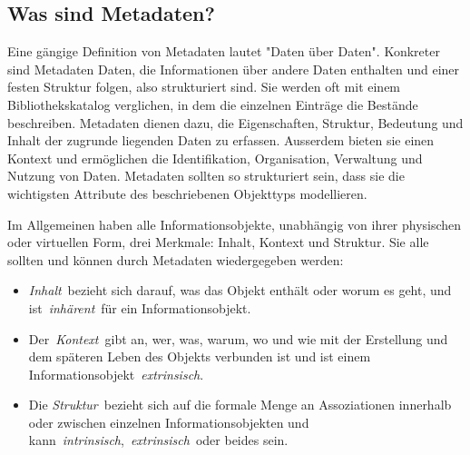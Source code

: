 \documentclass[
  nswissgerman,
  letterpaper,
  DIV=11,
  numbers=noendperiod]{scrartcl}
\begin{document}
\subsection{Was sind Metadaten?}\label{was-sind-metadaten}

Eine gängige Definition von Metadaten lautet "Daten über Daten".
Konkreter sind Metadaten Daten, die Informationen über andere Daten
enthalten und einer festen Struktur folgen, also strukturiert sind. Sie
werden oft mit einem Bibliothekskatalog verglichen, in dem die einzelnen
Einträge die Bestände beschreiben. Metadaten dienen dazu, die
Eigenschaften, Struktur, Bedeutung und Inhalt der zugrunde liegenden
Daten zu erfassen. Ausserdem bieten sie einen Kontext und ermöglichen
die Identifikation, Organisation, Verwaltung und Nutzung von Daten.
Metadaten sollten so strukturiert sein, dass sie die wichtigsten
Attribute des beschriebenen Objekttyps modellieren.

Im Allgemeinen haben alle Informationsobjekte, unabhängig von ihrer
physischen oder virtuellen Form, drei Merkmale: Inhalt, Kontext und
Struktur. Sie alle sollten und können durch Metadaten wiedergegeben
werden:

\begin{itemize}
\item
  \emph{Inhalt}~bezieht sich darauf, was das Objekt enthält oder worum
  es geht, und ist~\emph{inhärent}~für ein Informationsobjekt.
\item
  Der~\emph{Kontext}~gibt an, wer, was, warum, wo und wie mit der
  Erstellung und dem späteren Leben des Objekts verbunden ist und ist
  einem Informationsobjekt~\emph{extrinsisch}.
\item
  Die \emph{Struktur}~bezieht sich auf die formale Menge an
  Assoziationen innerhalb oder zwischen einzelnen Informationsobjekten
  und kann~\emph{intrinsisch},~\emph{extrinsisch}~oder beides sein.
\end{itemize}
\end{document}
